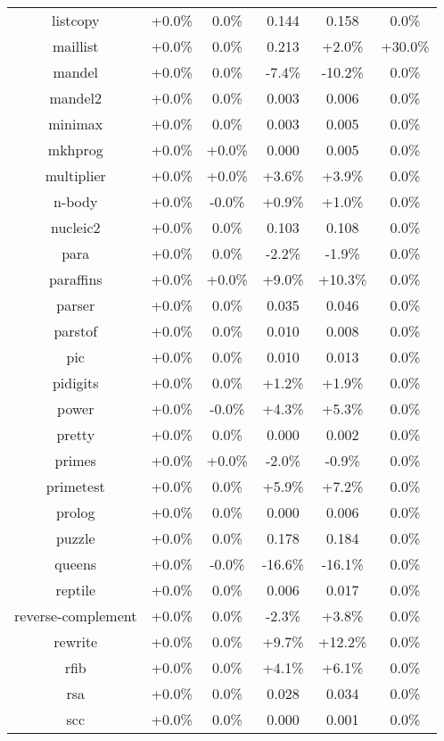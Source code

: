 \begin{tabular}{ c c c c c c }
listcopy & +0.0\% &  0.0\% & 0.144 & 0.158 &  0.0\%\\
maillist & +0.0\% &  0.0\% & 0.213 & +2.0\% & +30.0\%\\
mandel & +0.0\% &  0.0\% & -7.4\% & -10.2\% &  0.0\%\\
mandel2 & +0.0\% &  0.0\% & 0.003 & 0.006 &  0.0\%\\
minimax & +0.0\% &  0.0\% & 0.003 & 0.005 &  0.0\%\\
mkhprog & +0.0\% & +0.0\% & 0.000 & 0.005 &  0.0\%\\
multiplier & +0.0\% & +0.0\% & +3.6\% & +3.9\% &  0.0\%\\
n-body & +0.0\% & -0.0\% & +0.9\% & +1.0\% &  0.0\%\\
nucleic2 & +0.0\% &  0.0\% & 0.103 & 0.108 &  0.0\%\\
para & +0.0\% &  0.0\% & -2.2\% & -1.9\% &  0.0\%\\
paraffins & +0.0\% & +0.0\% & +9.0\% & +10.3\% &  0.0\%\\
parser & +0.0\% &  0.0\% & 0.035 & 0.046 &  0.0\%\\
parstof & +0.0\% &  0.0\% & 0.010 & 0.008 &  0.0\%\\
pic & +0.0\% &  0.0\% & 0.010 & 0.013 &  0.0\%\\
pidigits & +0.0\% &  0.0\% & +1.2\% & +1.9\% &  0.0\%\\
power & +0.0\% & -0.0\% & +4.3\% & +5.3\% &  0.0\%\\
pretty & +0.0\% &  0.0\% & 0.000 & 0.002 &  0.0\%\\
primes & +0.0\% & +0.0\% & -2.0\% & -0.9\% &  0.0\%\\
primetest & +0.0\% &  0.0\% & +5.9\% & +7.2\% &  0.0\%\\
prolog & +0.0\% &  0.0\% & 0.000 & 0.006 &  0.0\%\\
puzzle & +0.0\% &  0.0\% & 0.178 & 0.184 &  0.0\%\\
queens & +0.0\% & -0.0\% & -16.6\% & -16.1\% &  0.0\%\\
reptile & +0.0\% &  0.0\% & 0.006 & 0.017 &  0.0\%\\
reverse-complement & +0.0\% &  0.0\% & -2.3\% & +3.8\% &  0.0\%\\
rewrite & +0.0\% &  0.0\% & +9.7\% & +12.2\% &  0.0\%\\
rfib & +0.0\% &  0.0\% & +4.1\% & +6.1\% &  0.0\%\\
rsa & +0.0\% &  0.0\% & 0.028 & 0.034 &  0.0\%\\
scc & +0.0\% &  0.0\% & 0.000 & 0.001 &  0.0\%\\

\end{tabular}
